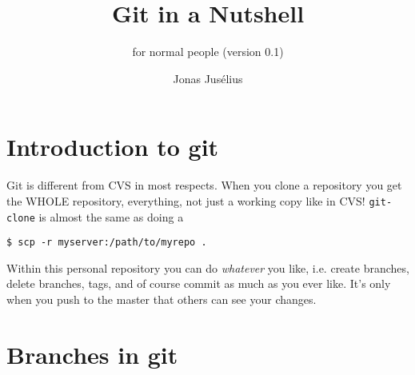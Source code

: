 \documentclass[a4paper,10pt]{article}
\begin{document}
\pagestyle{fancy}
\fancyfoot{}
\fancyhead{}
\renewcommand{\sectionmark}[1]{\markboth{\sf\thesection.\ #1}{}}
\renewcommand{\subsectionmark}[1]{}
\fancyhead[R]{{\rmfamily\thepage}}

\title{Git in a Nutshell}

\subtitle{for normal people (version 0.1)}
\author{{\sf Jonas Jus\'elius}}
\address{
{\tt <jonas.juselius@chem.uit.no>}\\
{\sf University of Tromsø}\\
{\sf Department of Chemistry}\\
{\sf N-9037 University of Tromsø, Norway}
}

\maketitle

\section{Introduction to git}
Git is different from CVS in most respects. When you clone a repository you
get the WHOLE repository, everything, not just a working copy like in CVS!
\texttt{git-clone} is almost the same as doing a
\begin{verbatim}
$ scp -r myserver:/path/to/myrepo .
\end{verbatim}
Within this personal repository you can do \textit{whatever} you like, i.e. create
branches, delete branches, tags, and of course commit as much as you ever
like. It's only when you push to the master that others can see your changes. 

\section{Branches in git}
\end{document}
